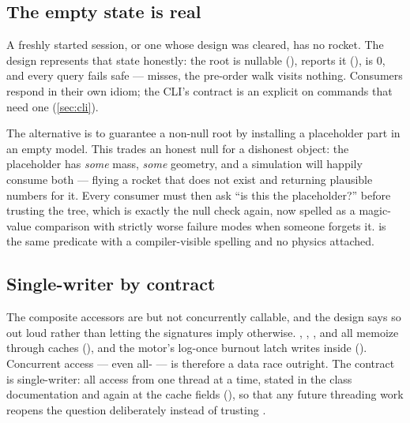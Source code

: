 \subsection{The empty state is real}\label{sec:philosophy-empty}

A freshly started session, or one whose design was cleared, has no rocket. The design
represents that state honestly: the root is nullable
(),  reports it
(),  is 0, and every query fails safe ---
 misses, the pre-order walk visits nothing. Consumers respond in their own idiom;
the CLI's contract is an explicit  on commands that need one
(\cref{sec:cli}).

\begin{rejected}
The alternative is to guarantee a non-null root by installing a placeholder part in an empty
model. This trades an honest null for a dishonest object: the placeholder has \emph{some}
mass, \emph{some} geometry, and a simulation will happily consume both --- flying a rocket
that does not exist and returning plausible numbers for it. Every consumer must then ask
``is this the placeholder?'' before trusting the tree, which is exactly the null check again,
now spelled as a magic-value comparison with strictly worse failure modes when someone
forgets it.  is the same predicate with a compiler-visible spelling and no
physics attached.
\end{rejected}

\subsection{Single-writer by contract}\label{sec:philosophy-threading}

The composite accessors are  but not concurrently callable, and the design says
so out loud rather than letting the signatures imply otherwise. ,
, , and  all memoize
through  caches (), and the motor's log-once
burnout latch writes inside  
(). Concurrent access --- even all- --- is
therefore a data race outright. The contract is single-writer: all access from one thread at
a time, stated in the class documentation and again at the cache fields
(), so that any future threading work reopens the question
deliberately instead of trusting .

